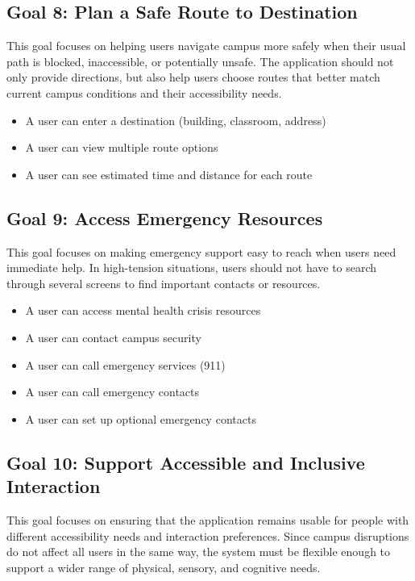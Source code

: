 \documentclass[sigconf]{acmart}
\begin{document}
\subsection{Goal 8: Plan a Safe Route to Destination}
This goal focuses on helping users navigate campus more safely when their usual path is blocked, inaccessible, or potentially unsafe. The application should not only provide directions, but also help users choose routes that better match current campus conditions and their accessibility needs.
 
\begin{itemize}[leftmargin=*, labelindent=0pt, itemsep=2pt]
    \item A user can enter a destination (building, classroom, address)
    \item A user can view multiple route options
    \item A user can see estimated time and distance for each route
\end{itemize}
 
\subsection{Goal 9: Access Emergency Resources}
This goal focuses on making emergency support easy to reach when users need immediate help. In high-tension situations, users should not have to search through several screens to find important contacts or resources.
 
\begin{itemize}[leftmargin=*, labelindent=0pt, itemsep=2pt]
    \item A user can access mental health crisis resources
    \item A user can contact campus security
    \item A user can call emergency services (911)
    \item A user can call emergency contacts
    \item A user can set up optional emergency contacts
\end{itemize}
 
\subsection{Goal 10: Support Accessible and Inclusive Interaction}
This goal focuses on ensuring that the application remains usable for people with different accessibility needs and interaction preferences. Since campus disruptions do not affect all users in the same way, the system must be flexible enough to support a wider range of physical, sensory, and cognitive needs.
 
\end{document}
